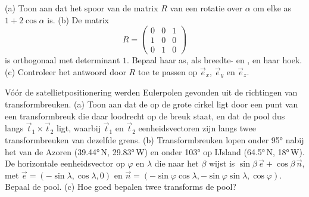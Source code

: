 \begin{exercise}[$\star\star\star$]\label{exo:b1:plate-kinematics:10}
(a) Toon aan dat het spoor van de matrix $R$ van een rotatie over $\alpha$ om elke as $1 + 2\cos\alpha$ is. (b) De matrix
\[
  R = \begin{pmatrix} 0 & 0 & 1\\ 1 & 0 & 0\\ 0 & 1 & 0\end{pmatrix}
\]
is orthogonaal met determinant $1$. Bepaal haar as, als breedte- en , en haar hoek. (c) Controleer het antwoord door $R$ toe te passen op $\vec e_x$, $\vec e_y$ en $\vec e_z$.
\end{exercise}

\begin{exercise}[$\star\star\star$]\label{exo:b1:plate-kinematics:11}
Vóór de satellietpositionering werden Eulerpolen gevonden uit de richtingen van transformbreuken. (a) Toon aan dat de  op de grote cirkel ligt door een punt van een transformbreuk die daar loodrecht op de breuk staat, en dat de pool dus langs $\vec t_1\times\vec t_2$ ligt, waarbij $\vec t_1$ en $\vec t_2$ eenheidsvectoren zijn langs twee transformbreuken van dezelfde grens. (b) Transformbreuken lopen onder \ang{95} nabij het  van de Azoren (\ang{39.44}\,N, \ang{29.83}\,W) en onder \ang{103} op IJsland (\ang{64.5}\,N, \ang{18}\,W). De horizontale eenheidsvector op  $\varphi$ en  $\lambda$ die naar het  $\beta$ wijst is $\sin\beta\,\vec e +
\cos\beta\,\vec n$, met $\vec e = (-\sin\lambda, \cos\lambda, 0)$ en $\vec n =
(-\sin\varphi\cos\lambda, -\sin\varphi\sin\lambda, \cos\varphi)$. Bepaal de pool. (c) Hoe goed bepalen twee transforms de pool?
\end{exercise}

